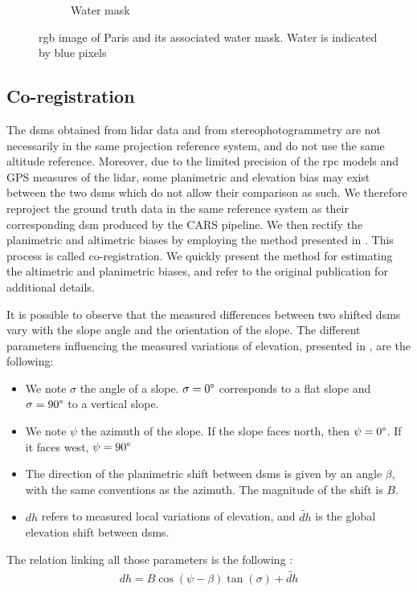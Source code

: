 \begin{figure}
\begin{subfigure}[t]{0.48\linewidth}
        \caption{Water mask}
        \label{fig:paris_watermask_2}
    \end{subfigure}
    \caption{\acrshort{rgb} image of Paris and its associated water mask. Water is indicated by blue pixels}
    \label{fig:paris_watermask}
\end{figure}

\subsection{Co-registration}
The \acrshort{dsm}s obtained from \acrshort{lidar} data and from stereophotogrammetry are not necessarily in the same projection reference system, and do not use the same altitude reference. Moreover, due to the limited precision of the \acrshort{rpc} models and GPS measures of the \acrshort{lidar}, some planimetric and elevation bias may exist between the two \acrshort{dsm}s which do not allow their comparison as such. We therefore reproject the ground truth data in the same reference system as their corresponding \acrshort{dsm} produced by the CARS pipeline. We then rectify the planimetric and altimetric biases by employing the method presented in \cite{nuth_co-registration_2011}. This process is called co-registration. We quickly present the method for estimating the altimetric and planimetric biases, and refer to the original publication for additional details.

It is possible to observe that the measured differences between two shifted \acrshort{dsm}s vary with the slope angle and the orientation of the slope. The different parameters influencing the measured variations of elevation, presented in , are the following:
\begin{itemize}
    \item We note $\sigma$ the angle of a slope. $\sigma=0\degree$ corresponds to a flat slope and $\sigma=90\degree$ to a vertical slope.
    \item We note $\psi$ the azimuth of the slope. If the slope faces north, then $\psi=0\degree$. If it faces west, $\psi=90\degree$ \etc
    \item The direction of the planimetric shift between \acrshort{dsm}s is given by an angle $\beta$, with the same conventions as the azimuth. The magnitude of the shift is $B$.
    \item $dh$ refers to measured local variations of elevation, and $\tilde{dh}$ is the global elevation shift between \acrshort{dsm}s.
\end{itemize}
The relation linking all those parameters is the following \cite{nuth_co-registration_2011}:
\begin{align}
    dh = B\cos(\psi-\beta)\tan(\sigma)+\tilde{dh}
\end{align}

